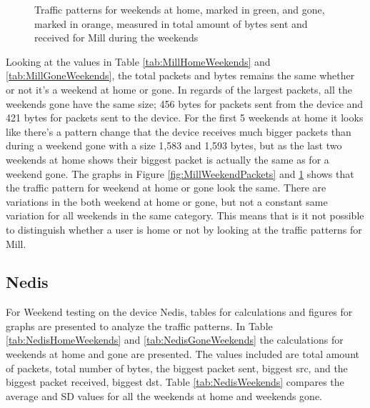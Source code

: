 \begin{figure}[H]
    \begin{subfigure}[b]{0.47\textwidth}
    \end{subfigure}
    \begin{subfigure}[b]{0.47\textwidth}
    \end{subfigure}
   \begin{subfigure}[b]{0.47\textwidth}
    \end{subfigure}
    \hspace{0.6cm}
    \begin{subfigure}[b]{0.47\textwidth}
    \end{subfigure}
    \caption{Traffic patterns for weekends at home, marked in green, and gone, marked in orange, measured in total amount of bytes sent and received for Mill during the weekends}
    \label{fig:MillWeekendBytes}
\end{figure}

Looking at the values in Table \ref{tab:MillHomeWeekends} and \ref{tab:MillGoneWeekends}, the total packets and bytes remains the same whether or not it's a weekend at home or gone. In regards of the largest packets, all the weekends gone have the same size; 456 bytes for packets sent from the device and 421 bytes for packets sent to the device. For the first 5 weekends at home it looks like there's a pattern change that the device receives much bigger packets than during a weekend gone with a size 1,583 and 1,593 bytes, but as the last two weekends at home shows their biggest packet is actually the same as for a weekend gone. The graphs in Figure \ref{fig:MillWeekendPackets} and \ref{fig:MillWeekendBytes} shows that the traffic pattern for weekend at home or gone look the same. There are variations in the both weekend at home or gone, but not a constant same variation for all weekends in the same category. This means that is it not possible to distinguish whether a user is home or not by looking at the traffic patterns for Mill.  

\newpage
\subsection{Nedis}
For Weekend testing on the device Nedis, tables for calculations and figures for graphs are presented to analyze the traffic patterns. In Table \ref{tab:NedisHomeWeekends} and \ref{tab:NedisGoneWeekends} the calculations for weekends at home and gone are presented. The values included are total amount of packets, total number of bytes, the biggest packet sent, biggest src, and the biggest packet received, biggest dst. Table \ref{tab:NedisWeekends} compares the average and \gls{SD} values for all the weekends at home and weekends gone.

